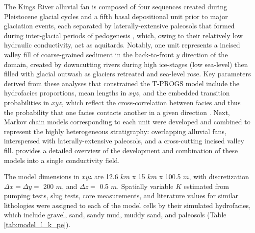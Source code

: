 The Kings River alluvial fan is composed of four sequences created during Pleistocene glacial cycles and a fifth basal depositional unit prior to major glaciation events, each separated by laterally-extensive paleosols that formed during inter-glacial periods of pedogenesis \citep{weissmann2002glacially}, which, owing to their relatively low hydraulic conductivity, act as aquitards. Notably, one unit represents a incised valley fill of coarse-grained sediment in the back-to-front $y$ direction of the domain, created by downcutting rivers during high ice-stages (low sea-level) then filled with glacial outwash as glaciers retreated and sea-level rose. Key parameters derived from these analyses that constrained the T-PROGS model include the hydrofacies proportions, mean lengths in $xyz$, and the embedded transition probabilities in $xyz$, which reflect the cross-correlation between facies and thus the probability that one facies contacts another in a given direction \citep{carle1996transition}. Next, Markov chain models corresponding to each unit were developed and combined to represent the highly heterogeneous stratigraphy: overlapping alluvial fans, interspersed with laterally-extensive paleosols, and a cross-cutting incised valley fill. \citet{weissmann2004influence} provides a detailed overview of the development and combination of these models into a single conductivity field. 

The model dimensions in $xyz$ are 12.6 $km$ x 15 $km$ x 100.5 $m$, with discretization $\Delta x = \Delta y = $ 200 $m$, and $\Delta z =$ 0.5 $m$. Spatially variable $K$ estimated from pumping tests, slug tests, core measurements, and literature values for similar lithologies \citep{burow1999evaluation, weissmann1999three} were assigned to each of the model cells by their simulated hydrofacies, which include gravel, sand, sandy mud, muddy sand, and paleosols (Table \ref{tab:model_l_k_pe}).


